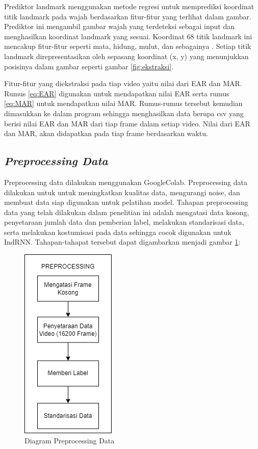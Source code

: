 Prediktor landmark menggunakan metode regresi untuk memprediksi koordinat titik landmark pada wajah berdasarkan fitur-fitur yang terlihat
dalam gambar. Prediktor ini mengambil gambar wajah yang terdeteksi sebagai input dan menghasilkan koordinat landmark yang sesuai.
Koordinat 68 titik landmark ini mencakup fitur-fitur seperti mata, hidung, mulut, dan sebagainya \parencite{13}. Setiap titik landmark
direpresentasikan oleh sepasang koordinat (x, y) yang menunjukkan posisinya dalam gambar seperti gambar \ref{fig:ekstraksi}.

Fitur-fitur yang diekstraksi pada tiap video yaitu nilai dari EAR dan MAR. Rumus \ref{eq:EAR} digunakan untuk mendapatkan
nilai EAR serta rumus \ref{eq:MAR} untuk mendapatkan nilai MAR. Rumus-rumus tersebut kemudian dimasukkan ke dalam program
sehingga menghasilkan data berupa csv yang berisi nilai EAR dan MAR dari tiap frame dalam setiap video. Nilai dari EAR dan MAR,
akan didapatkan pada tiap frame berdasarkan waktu.

\subsection{\emph{Preprocessing Data}}
Preprocessing data dilakukan menggunakan GoogleColab. Preprocessing data dilakukan untuk untuk meningkatkan kualitas data, mengurangi noise, dan membuat data siap digunakan untuk
pelatihan model. Tahapan preprocessing data yang telah dilakukan dalam penelitian ini adalah mengatasi data kosong, penyetaraan jumlah
data dan pemberian label, melakukan standarisasi data, serta melakukan kostumisasi pada data sehingga cocok digunakan untuk IndRNN.
Tahapan-tahapat tersebut dapat digambarkan menjadi gambar \ref{fig:preprocessing}:

\begin{figure} [H] \centering
      \includegraphics[scale=0.8]{gambar/preprocessing.png}
      \caption{Diagram Preprocessing Data}
      \label{fig:preprocessing}
\end{figure}

